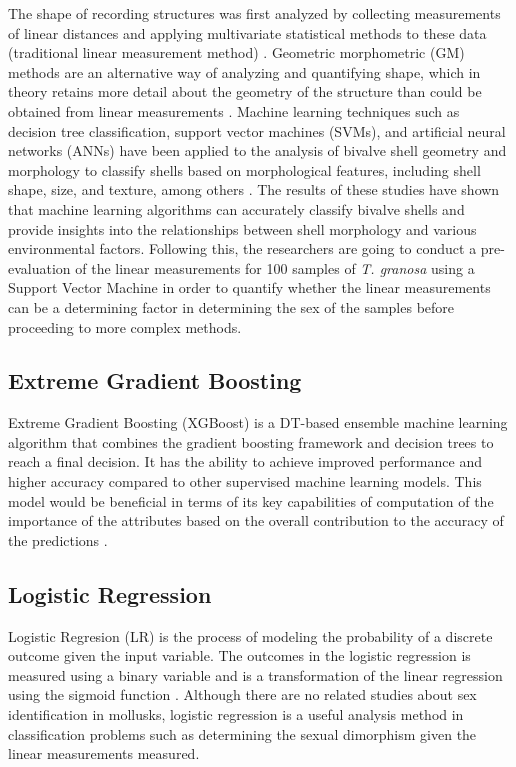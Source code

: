 The shape of recording structures was first analyzed by collecting measurements of linear distances and applying multivariate statistical methods to these data (traditional linear measurement method) \cite{rohlf1984}. Geometric morphometric (GM) methods are an alternative way of analyzing and quantifying shape, which in theory retains more detail about the geometry of the structure than could be obtained from linear measurements \cite{adams2004}. Machine learning techniques such as decision tree classification, support vector machines (SVMs), and artificial neural networks (ANNs) have been applied to the analysis of bivalve shell geometry and morphology to classify shells based on morphological features, including shell shape, size, and texture, among others \cite{kiel2021}. The results of these studies have shown that machine learning algorithms can accurately classify bivalve shells and provide insights into the relationships between shell morphology and various environmental factors.
Following this, the researchers are going to conduct a pre-evaluation of the linear measurements for 100 samples of \textit{T. granosa} using a Support Vector Machine in order to quantify whether the linear measurements can be a determining factor in determining the sex of the samples before proceeding to more complex methods. 

\subsection{Extreme Gradient Boosting}
Extreme Gradient Boosting (XGBoost) is a DT-based ensemble machine learning algorithm that combines the gradient boosting framework and decision trees to reach a final decision. It has the ability to achieve improved performance and higher accuracy compared to other supervised machine learning models. This model would be beneficial in terms of its key capabilities of computation of the importance of the attributes based on the overall contribution to the accuracy of the predictions \cite{torres2023}. 

\subsection{Logistic Regression}

Logistic Regresion (LR) is the process of modeling the probability of a discrete outcome given the input variable. The outcomes in the logistic regression is measured using a binary variable and is a transformation of the linear regression using the sigmoid function \cite{cui2020}. Although there are no related studies about sex identification in mollusks, logistic regression is a useful analysis method in classification problems such as determining the sexual dimorphism given the linear measurements measured. 

